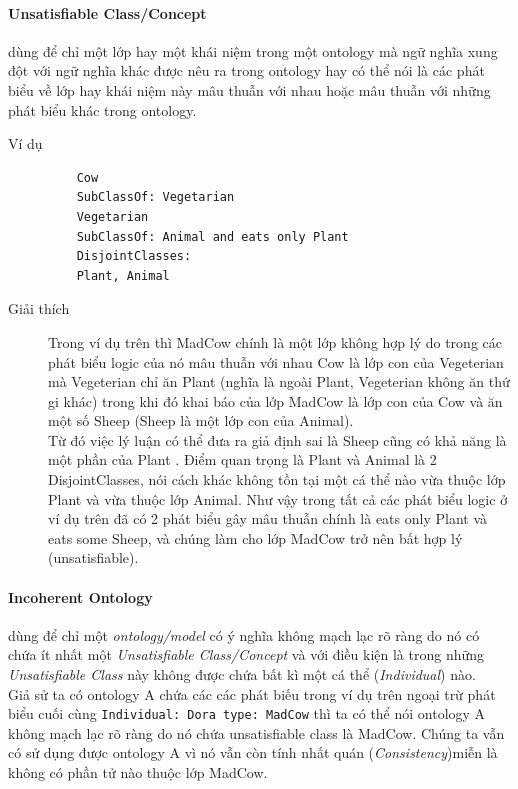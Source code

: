 \paragraph{Unsatisfiable Class/Concept} dùng để chỉ một lớp hay một khái niệm trong một ontology mà ngữ nghĩa xung đột với ngữ nghĩa khác được nêu ra trong ontology hay có thể nói là các phát biểu về lớp hay khái niệm này mâu thuẫn với nhau hoặc mâu thuẫn với những phát biểu khác trong ontology.
\begin{description}
	\item[Ví dụ]
	\begin{verbatim}
	Cow
	SubClassOf: Vegetarian
	Vegetarian
	SubClassOf: Animal and eats only Plant
	DisjointClasses:
	Plant, Animal
	\end{verbatim}
	\item[Giải thích]
	Trong ví dụ trên thì MadCow chính là một lớp không hợp lý do trong các phát biểu logic của nó mâu thuẫn với nhau Cow là lớp con của Vegeterian mà Vegeterian chỉ ăn Plant (nghĩa là ngoài Plant, Vegeterian không ăn thứ gi khác) trong khi đó khai báo của lớp MadCow là lớp con của Cow và ăn một số Sheep (Sheep là một lớp con của Animal).
	\\
	Từ đó việc lý luận có thể đưa ra giả định sai là Sheep cũng có khả năng là một phần của Plant . Điểm quan trọng là Plant và Animal là 2 DisjointClasses, nói cách khác không tồn tại một cá thể nào vừa thuộc lớp Plant và vừa thuộc lớp Animal. Như vậy trong tất cả các phát biểu logic ở ví dụ trên đã có 2 phát biểu gây mâu thuẫn chính là eats only Plant và eats some Sheep, và chúng làm cho lớp MadCow trở nên bất hợp lý (unsatisfiable).
\end{description}
\paragraph{Incoherent Ontology} dùng để chỉ một \textit{ontology/model} có ý nghĩa không mạch lạc rõ ràng do nó có chứa ít nhất một \textit{Unsatisfiable Class/Concept} và với điều kiện là trong những \textit{Unsatisfiable Class} này không được chứa bất kì một cá thể (\textit{Individual}) nào.
\\
\hspace{0.05\textwidth} Giả sử ta có ontology A chứa các các phát biếu trong ví dụ trên ngoại trừ phát biểu cuối cùng \texttt{Individual: Dora type: MadCow} thì ta có thể nói ontology A không mạch lạc rõ ràng do nó chứa unsatisfiable class là MadCow. Chúng ta vẫn có sử dụng được ontology A vì nó vẫn còn tính nhất quán (\textit{Consistency})miễn là không có phần tử nào thuộc lớp MadCow.
